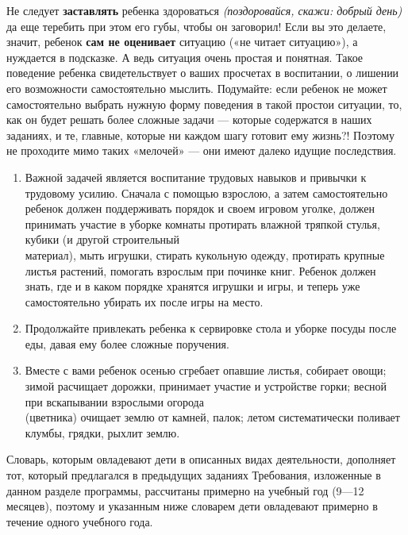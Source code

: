 \documentclass{book}
\renewcommand{\emph}[1]{\textit{#1}}
\begin{document}
Не следует \textbf{заставлять} ребенка здороваться \emph{(поздоровайся,
скажи: добрый день)} да еще теребить при этом его губы, чтобы он
заговорил! Если вы это делаете, значит, ребенок \textbf{сам не
оценивает} ситуацию («не читает ситуацию»), а нуждается в подсказке. А
ведь ситуация очень простая и понятная. Такое поведение ребенка
свидетельствует о ваших просчетах в воспитании, о лишении его
возможности самостоятельно мыслить. Подумайте: если ребенок не может
самостоятельно выбрать нужную форму поведения в такой простои ситуации,
то, как он будет решать более сложные задачи --- которые содержатся в
наших заданиях, и те, главные, которые ни каждом шагу готовит ему
жизнь?! Поэтому не проходите мимо таких «мелочей» --- они имеют далеко
идущие последствия.


\begin{enumerate}
\def\labelenumi{\arabic{enumi}.}
\setcounter{enumi}{5}
\item
  
  Важной задачей является воспитание трудовых навыков и привычки к
  трудовому усилию. Сначала с помощью взрослою, а затем самостоятельно
  ребенок должен поддерживать порядок и своем игровом уголке, должен
  принимать участие в уборке комнаты протирать влажной тряпкой стулья,
  кубики (и другой строительный\\
  материал), мыть игрушки, стирать кукольную одежду, протирать крупные
  листья растений, помогать взрослым при починке книг. Ребенок должен
  знать, где и в каком порядке хранятся игрушки и игры, и теперь уже
  самостоятельно убирать их после игры на место.
  
\item
  
  Продолжайте привлекать ребенка к сервировке стола и уборке посуды
  после еды, давая ему более сложные поручения.
  
\item
  
  Вместе с вами ребенок осенью сгребает опавшие листья, собирает овощи;
  зимой расчищает дорожки, принимает участие и устройстве горки; весной
  при вскапывании взрослыми огорода\\
  (цветника) очищает землю от камней, палок; летом систематически
  поливает клумбы, грядки, рыхлит землю.
  
\end{enumerate}


Словарь, которым овладевают дети в описанных видах деятельности,
дополняет тот, который предлагался в предыдущих заданиях Требования,
изложенные в данном разделе программы, рассчитаны примерно на учебный
год (9---12 месяцев), поэтому и указанным ниже словарем дети овладевают
примерно в течение одного учебного года.
\end{document}

